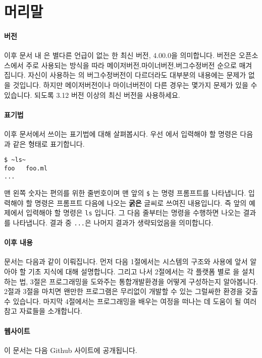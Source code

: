 \section{머리말}\label{sec:intro}


\paragraph{\OCAML{} 버전} 이후 문서 내 \OCAML{}은 별다른 언급이 없는 한 최신
버전, \OCAML{} 4.00.0을 의미합니다. \OCAML{} 버전은 오픈소스에서 주로
사용되는 방식을 따라 메이저버전.마이너버전.버그수정버전 순으로
매겨집니다. 자신이 사용하는 \OCAML{}의 버그수정버전이 다르더라도 대부분의
내용에는 문제가 없을 것입니다. 하지만 메이저버전이나 마이너버전이 다른 경우는
몇가지 문제가 있을 수 있습니다. 되도록 \OCAML{} 3.12 버전 이상의 최신 버전을
사용하세요.

\paragraph{표기법} 이후 문서에서 쓰이는 표기법에 대해 살펴봅시다. 우선
에서 입력해야 할 명령은 다음과 같은 형태로
표기합니다.

\begin{lstlisting}
$ ~ls~
foo   foo.ml
...
\end{lstlisting}

맨 왼쪽 숫자는 편의를 위한 줄번호이며 맨 앞의 \texttt{\$} %
는 명령 프롬프트를 나타냅니다. 입력해야 할 명령은 프롬프트 다음에 나오는
\textbf{굵은} 글씨로 쓰여진 내용입니다.
즉 앞의 예제에서 입력해야 할 명령은 \texttt{ls} 입니다.
그 다음 줄부터는 명령을 수행하면 나오는 결과를 나타냅니다. 결과 중
\texttt{...}은 나머지 결과가 생략되었음을 의미합니다.

\paragraph{이후 내용} 문서는 다음과 같이 이뤄집니다. 먼저 다음 1절에서는
\OCAML{} 시스템의 구조와 사용에 앞서 알아야 할 기초 지식에 대해 설명합니다.
그리고 나서 2절에서는 각 플랫폼 별로 \OCAML{}을 설치하는 법, 3절은 \OCAML{}
프로그래밍을 도와주는 통합개발환경을 어떻게 구성하는지 알아봅니다. 2절과 3절을
마치면 왠만한 \OCAML{} 프로그램은 무리없이 개발할 수 있는 그럴싸한 환경을 갖출
수 있습니다. 마지막 4절에서는 \OCAML{} 프로그래밍을 배우는 여정을 떠나는 데
도움이 될 여러 참고 자료들을 소개합니다.

\paragraph{웹사이트} 이 문서는 다음 \textsf{Github} 사이트에 공개됩니다.

